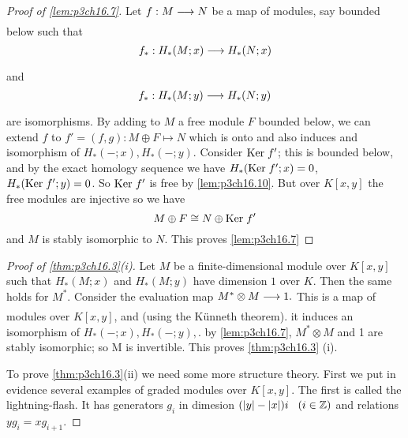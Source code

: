 \documentclass[../main]{subfiles}
\begin{document}
\begin{proof}[Proof of \ref{lem:p3ch16.7}] Let $f:M\lar{} N$ be a map of modules, say bounded below such that \begin{equation*}
    f_{\ast}: H_{\ast}(M;x) \lar{} H_{\ast}(N;x)
\end{equation*}
and \begin{equation*}
    f_{\ast}: H_{\ast}(M;y) \lar{} H_{\ast}(N;y)
\end{equation*}
are isomorphisms. By adding to $M$ a free module $F$ bounded below, we can extend $f$ to $f'=(f, g):M\oplus F \mapsto N$ which is onto and also induces and isomorphism of $H_{\ast}(-;x), H_{\ast}(-;y).$ Consider $\mathrm{Ker}\hspace{0.1cm}{f}'$; this is bounded below, and by the exact homology sequence we have $H_{\ast}(\mathrm{Ker}\hspace{0.1cm}f';x)=0$, $H_{\ast}(\mathrm{Ker}\hspace{0.1cm}f';y)=0$. So $\mathrm{Ker}\hspace{0.1cm}f'$ is free by \ref{lem:p3ch16.10}. But over $K[x, y]$ the free modules are injective so we have \begin{equation*}
    M \oplus F \cong N \oplus \mathrm{Ker}\hspace{0.1cm}f'
\end{equation*}
and $M$ is stably isomorphic to $N$. This proves \ref{lem:p3ch16.7}

\end{proof}
\begin{proof}[Proof of \ref{thm:p3ch16.3}(i)] Let $M$ be a finite-dimensional module over $K[x, y]$ such that $H_{\ast}(M;x)$ and $H_{\ast}(M;y)$ have dimension $1$ over $K$. Then the same holds for $M^{\ast}$. Consider the evaluation map $M^{\ast}\otimes M \lar{} 1.$ This is a map of modules over $K[x, y]$, and (using the Künneth theorem). it induces an isomorphism of $H_{\ast}(-;x), H_{\ast}(-;y), $. by \ref{lem:p3ch16.7}, $M^{\ast}\otimes M$ and 1 are stably isomorphic; so M is invertible. This proves \ref{thm:p3ch16.3} (i).

To prove \ref{thm:p3ch16.3}(ii) we need some more structure theory. First we put in evidence several examples of graded modules over $K[x, y]$. The
first is called the lightning-flash. It has generators $g_{i}$ in dimesion $(|y|-|x|)i \hspace{0.3cm}(i\in \mathbb{Z})$ and relations $yg_{i}=xg_{i+1}$.
\end{proof}
\end{document}
